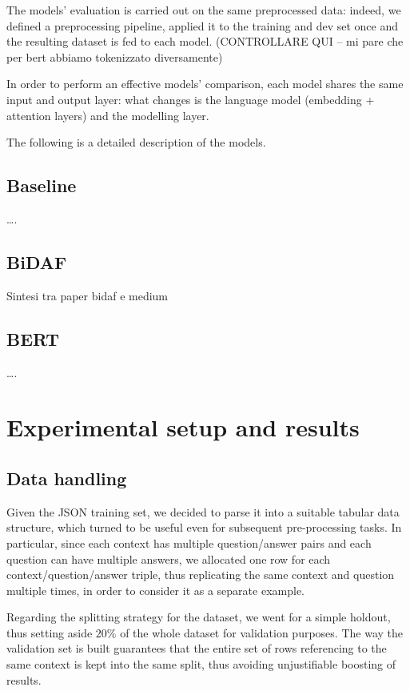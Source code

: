 \documentclass[a4paper,10pt]{report}
\begin{document}
The models’ evaluation is carried out on the same preprocessed data: indeed, we defined a preprocessing pipeline, applied it to the training and dev set once and the resulting dataset is fed to each model. (CONTROLLARE QUI – mi pare che per bert abbiamo tokenizzato diversamente)

In order to perform an effective models’ comparison, each model shares the same input and output layer: what changes is the language model (embedding + attention layers) and the modelling layer.

The following is a detailed description of the models.

\section{Baseline}\label{sec:baseline}

….

\section{BiDAF}\label{sec:bidaf}

Sintesi tra paper bidaf e medium

\section{BERT}\label{sec:bert}

….

\chapter{Experimental setup and results}\label{chap:experiments}

\section{Data handling}
Given the JSON training set, we decided to parse it into a suitable tabular data structure, which turned to be useful even for subsequent pre-processing tasks. In particular, since each context has multiple question/answer pairs and each question can have multiple answers, we allocated one row for each context/question/answer triple, thus replicating the same context and question multiple times, in order to consider it as a separate example.

Regarding the splitting strategy for the dataset, we went for a simple holdout, thus setting aside $20\%$ of the whole dataset for validation purposes. The way the validation set is built guarantees that the entire set of rows referencing to the same context is kept into the same split, thus avoiding unjustifiable boosting of results.
\end{document}
